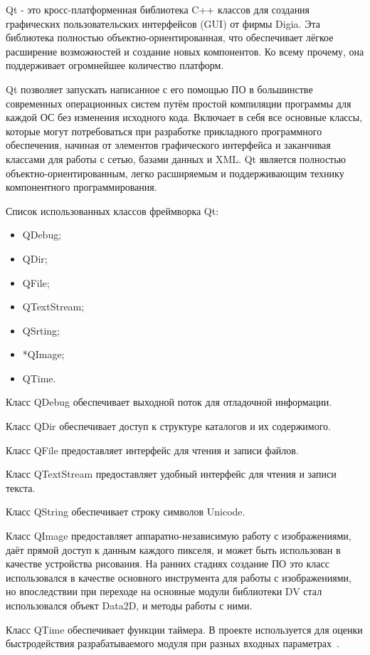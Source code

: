 Qt - это кросс-платформенная библиотека C++ классов для создания графических пользовательских интерфейсов (GUI) от фирмы Digia. Эта библиотека полностью объектно-ориентированная, что обеспечивает лёгкое расширение возможностей и создание новых компонентов. Ко всему прочему, она поддерживает огромнейшее количество платформ.

Qt позволяет запускать написанное с его помощью ПО в большинстве современных операционных систем путём простой компиляции программы для каждой ОС без изменения исходного кода. Включает в себя все основные классы, которые могут потребоваться при разработке прикладного программного обеспечения, начиная от элементов графического интерфейса и заканчивая классами для работы с сетью, базами данных и XML. Qt является полностью объектно-ориентированным, легко расширяемым и поддерживающим технику компонентного программирования.

Список использованных классов фреймворка Qt:
\begin{itemize}
\item QDebug;
\item QDir;
\item QFile;
\item QTextStream;
\item QSrting;
\item *QImage;
\item QTime.
\end{itemize}

Класс QDebug обеспечивает выходной поток для отладочной информации.

Класс QDir обеспечивает доступ к структуре каталогов и их содержимого.

Класс QFile предоставляет интерфейс для чтения и записи файлов.

Класс QTextStream предоставляет удобный интерфейс для чтения и записи текста.

Класс QString обеспечивает строку символов Unicode.

Класс QImage предоставляет аппаратно-независимую работу с изображениями, даёт прямой доступ к данным каждого пикселя, и может быть использован в качестве устройства рисования. На ранних стадиях создание ПО это класс использовался в качестве основного инструмента для работы с изображениями, но впоследствии при переходе на основные модули библиотеки DV стал использовался объект Data2D, и методы работы с ними.

Класс QTime обеспечивает функции таймера. В проекте используется для оценки быстродействия разрабатываемого модуля при разных входных параметрах~\cite{qt}. 

